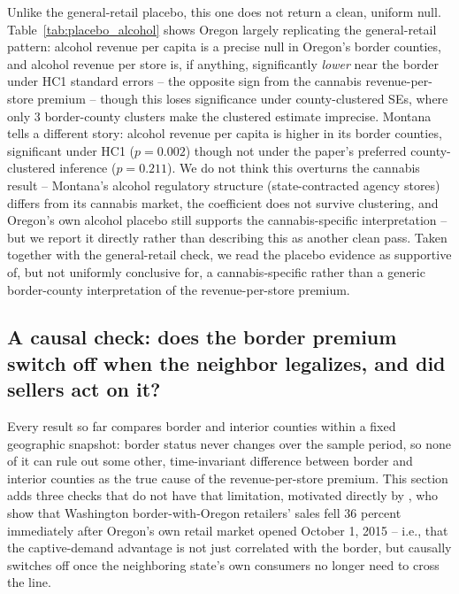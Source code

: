 ﻿\documentclass{article}
\begin{document}


Unlike the general-retail placebo, this one does not return a clean, uniform null.
Table~\ref{tab:placebo_alcohol} shows Oregon largely replicating the general-retail pattern: alcohol
revenue per capita is a precise null in Oregon's border counties, and alcohol revenue per store is, if
anything, significantly \emph{lower} near the border under HC1 standard errors -- the opposite sign from
the cannabis revenue-per-store premium -- though this loses significance under county-clustered SEs, where
only 3 border-county clusters make the clustered estimate imprecise. Montana tells a different story:
alcohol revenue per capita is higher in its border counties, significant under HC1 ($p=0.002$) though not
under the paper's preferred county-clustered inference ($p=0.211$). We do not think this overturns the
cannabis result -- Montana's alcohol regulatory structure (state-contracted agency stores) differs from its
cannabis market, the coefficient does not survive clustering, and Oregon's own alcohol placebo still
supports the cannabis-specific interpretation -- but we report it directly rather than describing this as
another clean pass. Taken together with the general-retail check, we read the placebo evidence as
supportive of, but not uniformly conclusive for, a cannabis-specific rather than a generic border-county
interpretation of the revenue-per-store premium.

\subsection{A causal check: does the border premium switch off when the neighbor legalizes, and did sellers act on it?}
\label{sec:switchoff}

Every result so far compares border and interior counties within a fixed geographic snapshot: border
status never changes over the sample period, so none of it can rule out some other, time-invariant
difference between border and interior counties as the true cause of the revenue-per-store premium. This
section adds three checks that do not have that limitation, motivated directly by
\citet{HansenMillerWeber2020}, who show that Washington border-with-Oregon retailers' sales fell 36 percent
immediately after Oregon's own retail market opened October 1, 2015 -- i.e., that the captive-demand
advantage is not just correlated with the border, but causally switches off once the neighboring state's
own consumers no longer need to cross the line.
\end{document}

